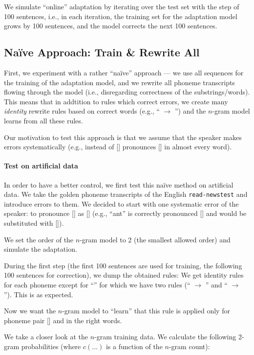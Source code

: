 We simulate ``online'' adaptation by iterating over the test set with the step of 100 sentences, i.e., in each iteration, the training set for the adaptation model grows by 100 sentences, and the model corrects the next 100 sentences.

\subsection{Na\"ive Approach: Train \& Rewrite All}
First, we experiment with a rather ``na\"ive'' approach --- we use all sequences for the training of the adaptation model, and we rewrite all phoneme transcripts flowing through the model (i.e., disregarding correctness of the substrings/words). This means that in addtition to rules which correct errors, we create many \emph{identity} rewrite rules based on correct words (e.g., `` $\rightarrow$ '') and the $n$-gram model learns from all these rules. 

Our motivation to test this approach is that we assume that the speaker makes errors systematically (e.g., instead of [] pronounces [] in almost every word).

\paragraph{Test on artificial data}
In order to have a better control, we first test this na\"ive method on artificial data. We take the golden phoneme transcripts of the English \texttt{read-news\-test} and introduce errors to them. We decided to start with one systematic error of the speaker: to pronounce [] as [] (e.g., ``ant'' is correctly pronounced [] and would be substituted with []). 

We set the order of the $n$-gram model to 2 (the smallest allowed order) and simulate the adaptation. 

During the first step (the first 100 sentences are used for training, the following 100 sentences for correction), we dump the obtained rules: We get identity rules for each phoneme except for ``'' for which we have two rules (`` $\rightarrow$ '' and `` $\rightarrow$ ''). This is as expected. 

Now we want the $n$-gram model to ``learn'' that this rule is applied only for phoneme pair [] and in the right words.

We take a closer look at the $n$-gram training data. We calculate the following 2-gram probabilities (where $c(...)$ is a function of the $n$-gram count):   

